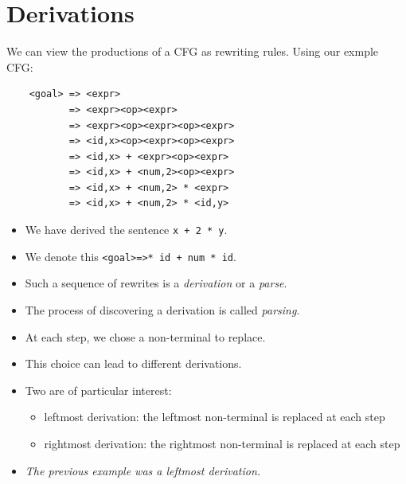 \documentclass[10pt]{article}
\begin{document}
\section*{Derivations}
We can view the productions of a CFG as rewriting rules.  Using our exmple CFG:
\begin{verbatim}
    <goal> => <expr>
           => <expr><op><expr>
           => <expr><op><expr><op><expr>
           => <id,x><op><expr><op><expr>
           => <id,x> + <expr><op><expr>
           => <id,x> + <num,2><op><expr>
           => <id,x> + <num,2> * <expr>
           => <id,x> + <num,2> * <id,y>
\end{verbatim}
\begin{itemize}
    \item We have derived the sentence \texttt{x + 2 * y}.\
    \item We denote this \texttt{<goal>=>* id + num * id}.
    \item Such a sequence of rewrites is a \textit{derivation} or a \textit{parse}.
    \item The process of discovering a derivation is called \textit{parsing}.
    \item At each step, we chose a non-terminal to replace.
    \item This choice can lead to different derivations.
    \item Two are of particular interest:
    \begin{itemize}
        \item leftmost derivation: the leftmost non-terminal is replaced at each step
        \item rightmost derivation: the rightmost non-terminal is replaced at each step
    \end{itemize}
    \item \textit{The previous example was a leftmost derivation.}
\end{itemize}
\end{document}

